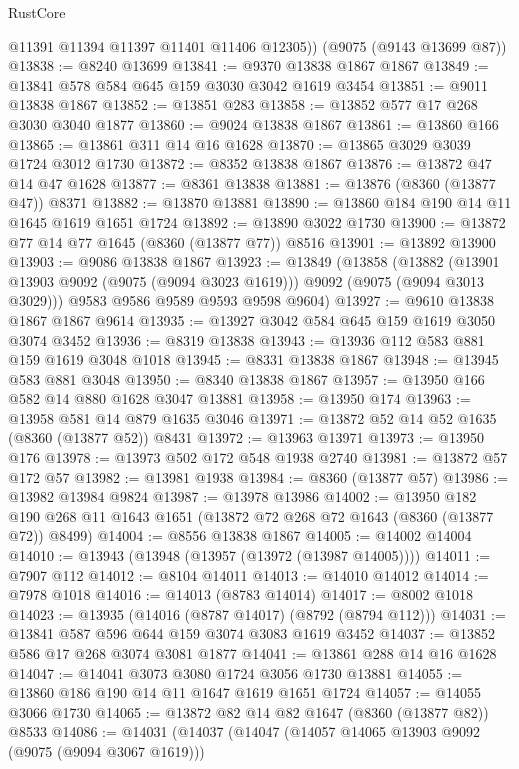 \begin{lexlean}{RustCore}
\begin{coremodule}
        @11391
        @11394
        @11397
        @11401
        @11406
        @12305))
    (@9075 (@9143 @13699 @87))
@13838 := @8240 @13699
@13841 := @9370 @13838 @1867 @1867
@13849 := @13841 @578 @584 @645 @159 @3030 @3042 @1619 @3454
@13851 := @9011 @13838 @1867
@13852 := @13851 @283
@13858 := @13852 @577 @17 @268 @3030 @3040 @1877
@13860 := @9024 @13838 @1867
@13861 := @13860 @166
@13865 := @13861 @311 @14 @16 @1628
@13870 := @13865 @3029 @3039 @1724 @3012 @1730
@13872 := @8352 @13838 @1867
@13876 := @13872 @47 @14 @47 @1628
@13877 := @8361 @13838
@13881 := @13876 (@8360 (@13877 @47)) @8371
@13882 := @13870 @13881
@13890 := @13860 @184 @190 @14 @11 @1645 @1619 @1651 @1724
@13892 := @13890 @3022 @1730
@13900 := @13872 @77 @14 @77 @1645 (@8360 (@13877 @77)) @8516
@13901 := @13892 @13900
@13903 := @9086 @13838 @1867
@13923 := @13849
    (@13858
      (@13882 (@13901 @13903 @9092 (@9075 (@9094 @3023 @1619))) @9092 (@9075 (@9094 @3013 @3029)))
      @9583
      @9586
      @9589
      @9593
      @9598
      @9604)
@13927 := @9610 @13838 @1867 @1867 @9614
@13935 := @13927 @3042 @584 @645 @159 @1619 @3050 @3074 @3452
@13936 := @8319 @13838
@13943 := @13936 @112 @583 @881 @159 @1619 @3048 @1018
@13945 := @8331 @13838 @1867
@13948 := @13945 @583 @881 @3048
@13950 := @8340 @13838 @1867
@13957 := @13950 @166 @582 @14 @880 @1628 @3047 @13881
@13958 := @13950 @174
@13963 := @13958 @581 @14 @879 @1635 @3046
@13971 := @13872 @52 @14 @52 @1635 (@8360 (@13877 @52)) @8431
@13972 := @13963 @13971
@13973 := @13950 @176
@13978 := @13973 @502 @172 @548 @1938 @2740
@13981 := @13872 @57 @172 @57
@13982 := @13981 @1938
@13984 := @8360 (@13877 @57)
@13986 := @13982 @13984 @9824
@13987 := @13978 @13986
@14002 := @13950
    @182
    @190
    @268
    @11
    @1643
    @1651
    (@13872 @72 @268 @72 @1643 (@8360 (@13877 @72)) @8499)
@14004 := @8556 @13838 @1867
@14005 := @14002 @14004
@14010 := @13943 (@13948 (@13957 (@13972 (@13987 @14005))))
@14011 := @7907 @112
@14012 := @8104 @14011
@14013 := @14010 @14012
@14014 := @7978 @1018
@14016 := @14013 (@8783 @14014)
@14017 := @8002 @1018
@14023 := @13935 (@14016 (@8787 @14017) (@8792 (@8794 @112)))
@14031 := @13841 @587 @596 @644 @159 @3074 @3083 @1619 @3452
@14037 := @13852 @586 @17 @268 @3074 @3081 @1877
@14041 := @13861 @288 @14 @16 @1628
@14047 := @14041 @3073 @3080 @1724 @3056 @1730 @13881
@14055 := @13860 @186 @190 @14 @11 @1647 @1619 @1651 @1724
@14057 := @14055 @3066 @1730
@14065 := @13872 @82 @14 @82 @1647 (@8360 (@13877 @82)) @8533
@14086 := @14031
    (@14037
      (@14047
        (@14057 @14065 @13903 @9092 (@9075 (@9094 @3067 @1619)))

\end{coremodule}
\end{lexlean}
